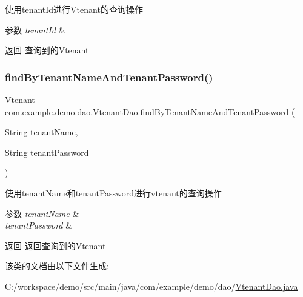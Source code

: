 使用tenant\+Id进行\+Vtenant的查询操作 
\begin{DoxyParams}{参数}
{\em tenant\+Id} & \\
\hline
\end{DoxyParams}
\begin{DoxyReturn}{返回}
查询到的\+Vtenant 
\end{DoxyReturn}
\mbox{\label{interfacecom_1_1example_1_1demo_1_1dao_1_1_vtenant_dao_accfcbdd7bf6ae1be3eb8cf1eed105f53}} 
\subsubsection{\texorpdfstring{find\+By\+Tenant\+Name\+And\+Tenant\+Password()}{findByTenantNameAndTenantPassword()}}
{\footnotesize\ttfamily \mbox{\hyperlink{classcom_1_1example_1_1demo_1_1modular_1_1_vtenant}{Vtenant}} com.\+example.\+demo.\+dao.\+Vtenant\+Dao.\+find\+By\+Tenant\+Name\+And\+Tenant\+Password (\begin{DoxyParamCaption}\item[{String}]{tenant\+Name,  }\item[{String}]{tenant\+Password }\end{DoxyParamCaption})}

使用tenant\+Name和tenant\+Password进行vtenant的查询操作 
\begin{DoxyParams}{参数}
{\em tenant\+Name} & \\
\hline
{\em tenant\+Password} & \\
\hline
\end{DoxyParams}
\begin{DoxyReturn}{返回}
返回查询到的\+Vtenant 
\end{DoxyReturn}


该类的文档由以下文件生成\+:\begin{DoxyCompactItemize}
\item 
C\+:/workspace/demo/src/main/java/com/example/demo/dao/\mbox{\hyperlink{_vtenant_dao_8java}{Vtenant\+Dao.\+java}}\end{DoxyCompactItemize}
